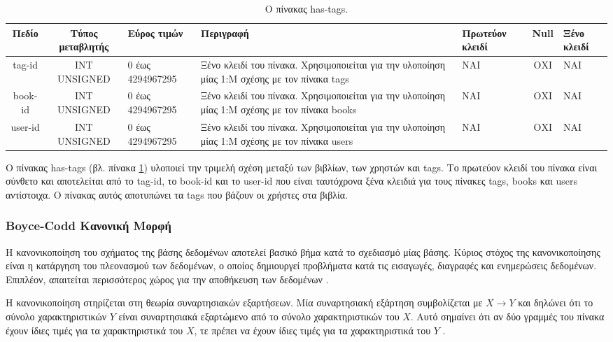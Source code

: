 \documentclass{assignment}
\begin{document}
\begin{landscape}
\begin{table}[htbp]
\begin{center}
  \begin{tabular}{|c|c|m{}|m{}|m{2.0cm}|c|m{1.5cm}|}
    \hline
    {\bf Πεδίο} & {\bf Τύπος μεταβλητής} & {\bf Εύρος τιμών} & {\bf Περιγραφή} & {\bf Πρωτεύον κλειδί} & {\bf Null} & {\bf Ξένο κλειδί} \\ \hline
    tag-id & INT UNSIGNED & 0 έως 4294967295 & Ξένο κλειδί του πίνακα. Χρησιμοποιείται για την υλοποίηση μίας 1:Μ σχέσης με τον πίνακα tags & ΝΑΙ & ΟΧΙ & NAI \\ \hline
    book-id & INT UNSIGNED & 0 έως 4294967295 & Ξένο κλειδί του πίνακα. Χρησιμοποιείται για την υλοποίηση μίας 1:Μ σχέσης με τον πίνακα books & ΝΑΙ & ΟΧΙ & NAI \\ \hline
    user-id & INT UNSIGNED & 0 έως 4294967295 & Ξένο κλειδί του πίνακα. Χρησιμοποιείται για την υλοποίηση μίας 1:Μ σχέσης με τον πίνακα users & ΝΑΙ & ΟΧΙ & NAI \\ \hline
  \end{tabular}
\caption{Ο πίνακας has-tags.}
\label{table:db_table:has-tags}
\end{center}
\end{table}

Ο πίνακας has-tags (βλ. πίνακα \ref{table:db_table:has-tags}) υλοποιεί την τριμελή σχέση μεταξύ των βιβλίων, των χρηστών και tags. Το πρωτεύον κλειδί του πίνακα είναι σύνθετο και αποτελείται από το tag-id, το book-id και το user-id που είναι ταυτόχρονα ξένα κλειδιά για τους πίνακες  tags, books και users αντίστοιχα. Ο πίνακας αυτός αποτυπώνει τα tags που βάζουν οι χρήστες στα βιβλία.
\end{landscape} 

\subsubsection{Boyce-Codd Κανονική Μορφή}

Η κανονικοποίηση του σχήματος της βάσης δεδομένων αποτελεί βασικό βήμα κατά το σχεδιασμό μίας βάσης. Κύριος στόχος της κανονικοποίησης είναι η κατάργηση του πλεονασμού των δεδομένων, ο οποίος δημιουργεί προβλήματα κατά τις εισαγωγές, διαγραφές και ενημερώσεις δεδομένων. Επιπλέον, απαιτείται περισσότερος χώρος για την αποθήκευση των δεδομένων \cite{baseis_manolopoulos, wiki:normalization}. 

Η κανονικοποίηση στηρίζεται στη θεωρία συναρτησιακών εξαρτήσεων. Μία συναρτησιακή εξάρτηση συμβολίζεται με $X \rightarrow Y$ και δηλώνει ότι το σύνολο χαρακτηριστικών $Y$ είναι συναρτησιακά εξαρτώμενο από το σύνολο χαρακτηριστικών του $X$. Αυτό σημαίνει ότι αν δύο γραμμές του πίνακα έχουν ίδιες τιμές για τα χαρακτηριστικά του $X$, τε πρέπει να έχουν ίδιες τιμές για τα χαρακτηριστικά του $Y$ \cite{baseis_manolopoulos}.
\end{document}
